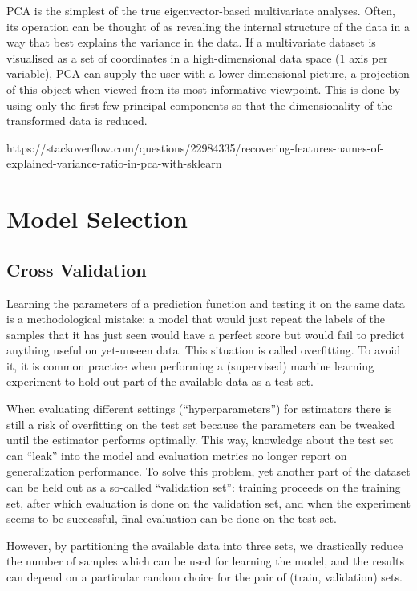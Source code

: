 \documentclass[11pt]{article}
\theoremstyle{plain}
\theoremstyle{definition}
\begin{document}
PCA is the simplest of the true eigenvector-based multivariate analyses. Often, its operation can be thought of as revealing the internal structure of the data in a way that best explains the variance in the data. If a multivariate dataset is visualised as a set of coordinates in a high-dimensional data space (1 axis per variable), PCA can supply the user with a lower-dimensional picture, a projection of this object when viewed from its most informative viewpoint. This is done by using only the first few principal components so that the dimensionality of the transformed data is reduced.

https://stackoverflow.com/questions/22984335/recovering-features-names-of-explained-variance-ratio-in-pca-with-sklearn


\section{Model Selection}

\subsection{Cross Validation}
Learning the parameters of a prediction function and testing it on the same data is a methodological mistake: a model that would just repeat the labels of the samples that it has just seen would have a perfect score but would fail to predict anything useful on yet-unseen data. This situation is called overfitting. To avoid it, it is common practice when performing a (supervised) machine learning experiment to hold out part of the available data as a test set.

When evaluating different settings (“hyperparameters”) for estimators there is still a risk of overfitting on the test set because the parameters can be tweaked until the estimator performs optimally. This way, knowledge about the test set can “leak” into the model and evaluation metrics no longer report on generalization performance. To solve this problem, yet another part of the dataset can be held out as a so-called “validation set”: training proceeds on the training set, after which evaluation is done on the validation set, and when the experiment seems to be successful, final evaluation can be done on the test set.

However, by partitioning the available data into three sets, we drastically reduce the number of samples which can be used for learning the model, and the results can depend on a particular random choice for the pair of (train, validation) sets.
\end{document}
